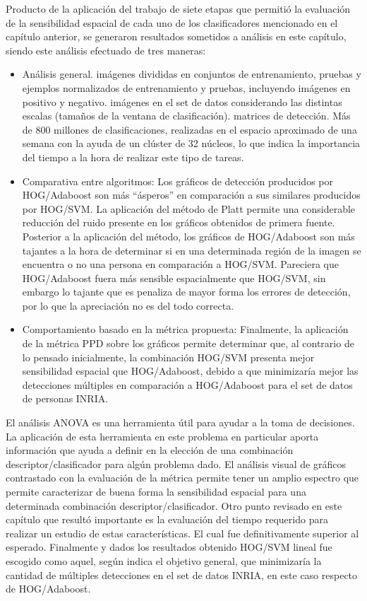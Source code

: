 Producto de la aplicación del trabajo de siete etapas que permitió la evaluación de la sensibilidad espacial de cada uno de los clasificadores mencionado en el capítulo anterior, se generaron resultados sometidos a análisis en este capítulo, siendo este análisis efectuado de tres maneras:
\begin{itemize}
\item Análisis general.
	 imágenes divididas en conjuntos de entrenamiento, pruebas y ejemplos normalizados de entrenamiento y pruebas, incluyendo imágenes en positivo y negativo.
	 imágenes en el set de datos considerando las distintas escalas (tamaños de la ventana de clasificación).
	 matrices de detección.
	\subitem  Más de 800 millones de clasificaciones, realizadas en el espacio aproximado de una semana con la ayuda de un clúster de 32 núcleos, lo que indica la importancia del tiempo a la hora de realizar este tipo de tareas.
\item Comparativa entre algoritmos:
	\subitem Los gráficos de detección producidos por HOG/Adaboost son más ``ásperos'' en comparación a sus similares producidos por HOG/SVM.
	\subitem  La aplicación del método de Platt permite una considerable reducción del ruido presente en los gráficos obtenidos de primera fuente.
	\subitem  Posterior a la aplicación del método, los gráficos de HOG/Adaboost son más tajantes a la hora de determinar si en una determinada región de la imagen se encuentra o no una persona en comparación a HOG/SVM. Pareciera que HOG/Adaboost fuera más sensible espacialmente que HOG/SVM, sin embargo lo tajante que es penaliza de mayor forma los errores de detección, por lo que la apreciación no es del todo correcta.
\item Comportamiento basado en la métrica propuesta: Finalmente, la aplicación de la métrica PPD sobre los gráficos permite determinar que, al contrario de lo pensado inicialmente, la combinación HOG/SVM presenta mejor sensibilidad espacial que HOG/Adaboost, debido a que minimizaría mejor las detecciones múltiples en comparación a HOG/Adaboost para el set de datos de personas INRIA.
\end{itemize}


El análisis ANOVA es una herramienta útil para ayudar a la toma de decisiones. La aplicación de esta herramienta en este problema en particular aporta información que ayuda a definir en la elección de una combinación descriptor/clasificador para algún problema dado. El análisis visual de gráficos contrastado con la evaluación de la métrica permite tener un amplio espectro que permite caracterizar de buena forma la sensibilidad espacial para una determinada combinación descriptor/clasificador.
Otro punto revisado en este capítulo que resultó importante es la evaluación del tiempo requerido para realizar un estudio de estas características. El cual fue definitivamente superior al esperado.
Finalmente y dados los resultados obtenido HOG/SVM lineal fue escogido como aquel, según indica el objetivo general, que minimizaría la cantidad de múltiples detecciones en el set de datos INRIA, en este caso respecto de HOG/Adaboost. 